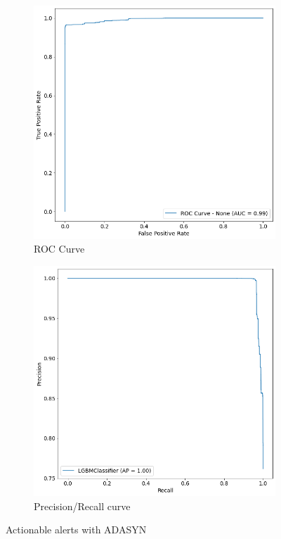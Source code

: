 \begin{figure}[H]
\begin{subfigure}{.5\textwidth}
		\includegraphics[scale=0.3]{./src/actAlerts/actalerts_adasyn_roc.png}
		\caption{ROC Curve}\label{}
	\end{subfigure}%
	\begin{subfigure}{.5\textwidth}
		\centering
		\includegraphics[scale=0.3]{./src/actAlerts/actalerts_adasyn_pr.png}
		\caption{Precision/Recall curve}\label{}
	\end{subfigure}  
	\caption{Actionable alerts with ADASYN}
	\label{results:actalerts_best}
\end{figure}

